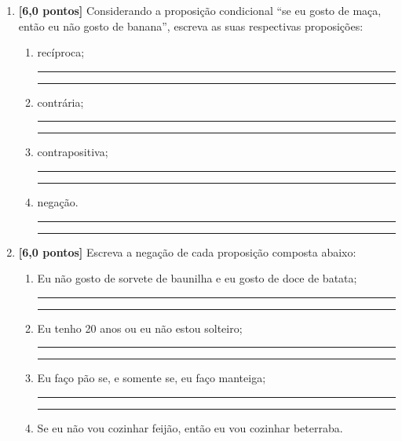 \documentclass[12pt,a4paper]{article}
\begin{document}
\begin{enumerate}
  \item \textbf{[6,0 pontos]} Considerando a proposição condicional ``se eu 
  gosto de maça, então eu não gosto de banana'', escreva as suas respectivas 
  proposições:

    \begin{enumerate}
      \item recíproca;

      \rule{\linewidth}{0.1mm}
      
      \rule{\linewidth}{0.1mm}
            
      \item contrária;

      \rule{\linewidth}{0.1mm}
      
      \rule{\linewidth}{0.1mm}

      \item contrapositiva;

      \rule{\linewidth}{0.1mm}
      
      \rule{\linewidth}{0.1mm}
      
      \item negação.

      \rule{\linewidth}{0.1mm}
      
      \rule{\linewidth}{0.1mm}
    \end{enumerate}

  \item \textbf{[6,0 pontos]} Escreva a negação de cada proposição composta abaixo:

    \begin{enumerate}
      \item Eu não gosto de sorvete de baunilha e eu gosto de doce de batata;

      \rule{\linewidth}{0.1mm}
      
      \rule{\linewidth}{0.1mm}
            
      \item Eu tenho 20 anos ou eu não estou solteiro;

      \rule{\linewidth}{0.1mm}
      
      \rule{\linewidth}{0.1mm}

      \item Eu faço pão se, e somente se, eu faço manteiga;

      \rule{\linewidth}{0.1mm}
      
      \rule{\linewidth}{0.1mm}
      
      \item Se eu não vou cozinhar feijão, então eu vou cozinhar beterraba.


\end{enumerate}
\end{enumerate}
\end{document}

